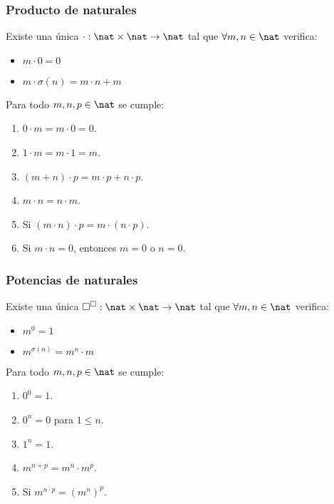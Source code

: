 \subsubsection{Producto de naturales}
\begin{nth}
    Existe una única $\cdot : \nat \times \nat \rightarrow \nat$ tal que $\forall m,n \in \nat$ verifica:
    \begin{itemize}
        \item $m \cdot 0 = 0$
        \item $m \cdot \sigma(n) =  m \cdot n + m$
    \end{itemize}
\end{nth}

\begin{properties}
    Para todo $m,n,p \in \nat$ se cumple:
    \begin{enumerate}
        \item $0 \cdot m = m \cdot 0 = 0$.
        \item $1 \cdot m = m \cdot 1 = m$.
        \item $(m + n) \cdot p = m \cdot p + n \cdot p$.
        \item $m \cdot n = n \cdot m$.
        \item Si $(m \cdot n) \cdot p = m \cdot (n \cdot p)$.
        \item Si $m \cdot n = 0$, entonces $m = 0$ o $n = 0$.
    \end{enumerate}
\end{properties}

\subsubsection{Potencias de naturales}
\begin{nth}
    Existe una única $\square^{\square} : \nat \times \nat \rightarrow \nat$ tal que $\forall m,n \in \nat$ verifica:
    \begin{itemize}
        \item $m^{0} = 1$
        \item $m^{\sigma(n)} =  m^{n} \cdot m$
    \end{itemize}
\end{nth}

\begin{properties}
    Para todo $m,n,p \in \nat$ se cumple:
    \begin{enumerate}
        \item $0^{0} = 1$.
        \item $0^{n} = 0$ para $1 \leq n$.
        \item $1^{n} = 1$.
        \item $m^{n+p} = m^{n} \cdot m^{p}$.
        \item Si $m^{n \cdot p} = (m^{n})^{p}$.
    \end{enumerate}
\end{properties}

